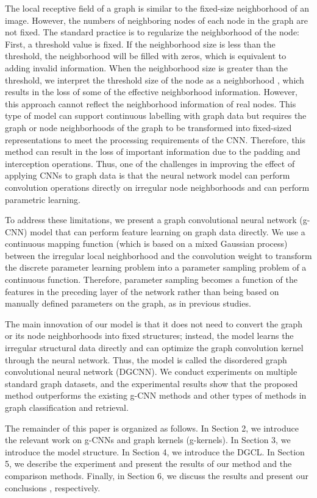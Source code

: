 \documentclass[11pt]{article}
\begin{document}
The local receptive field of a graph is similar to the fixed-size neighborhood of an image. However, the numbers of neighboring nodes of each node in the graph are not fixed. The standard practice is to regularize the neighborhood of the node: First, a threshold value is fixed. If the neighborhood size is less than the threshold, the neighborhood will be filled with zeros, which is equivalent to adding invalid information. When the neighborhood size is greater than the threshold, we interpret the threshold size of the node as a neighborhood , which results in the loss of some of the effective neighborhood information. However, this approach cannot reflect the neighborhood information of real nodes. This type of model can support continuous labelling with graph data but requires the graph or node neighborhoods of the graph to be transformed into fixed-sized representations to meet the processing requirements of the CNN. Therefore, this method can result in the loss of important information due to the padding and interception operations. Thus, one of the challenges in improving the effect of applying CNNs to graph data is that the neural network model can perform convolution operations directly on irregular node neighborhoods and can perform parametric learning.

To address these limitations, we present a graph convolutional neural network (g-CNN) model that can perform feature learning on graph data directly. We use a continuous mapping function (which is based on a mixed Gaussian process) between the irregular local neighborhood and the convolution weight to transform the discrete parameter learning problem into a parameter sampling problem of a continuous function. Therefore, parameter sampling becomes a function of the features in the preceding layer of the network rather than being based on manually defined parameters on the graph, as in previous studies.

The main innovation of our model is that it does not need to convert the graph or its node neighborhoods into fixed structures; instead, the model learns the irregular structural data directly and can optimize the graph convolution kernel through the neural network. Thus, the model is called the disordered graph convolutional neural network (DGCNN). We conduct experiments on multiple standard graph datasets, and the experimental results show that the proposed method outperforms the existing g-CNN methods and other types of methods in graph classification and retrieval.


The remainder of this paper is organized as follows. In Section 2, we introduce the relevant work on g-CNNs and graph kernels (g-kernels). In Section 3, we introduce the model structure. In Section 4, we introduce the DGCL. In Section 5, we describe the experiment and present the results of our method and the comparison methods. Finally, in Section 6, we discuss the results and present our conclusions , respectively.
\end{document}

